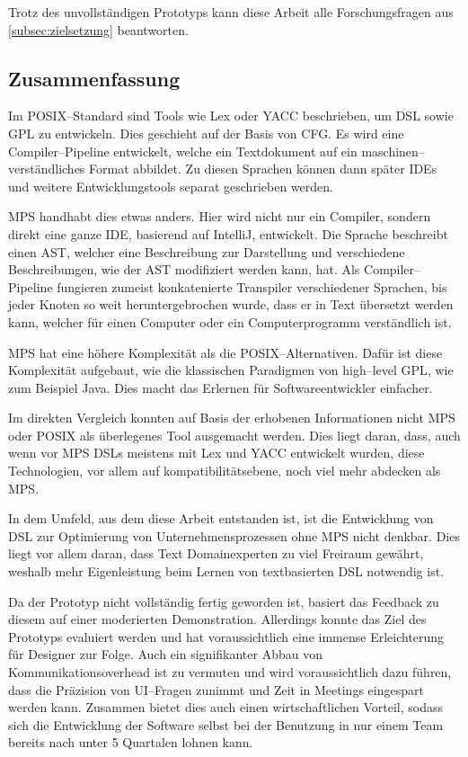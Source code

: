 Trotz des unvollständigen Prototyps kann diese Arbeit alle Forschungsfragen aus \autoref{subsec:zielsetzung} beantworten.

\subsection{Zusammenfassung}\label{subsec:zusammenfassung}
Im \acs{POSIX}--Standard sind Tools wie Lex oder \ac{YACC} beschrieben, um \ac{DSL} sowie \ac{GPL} zu entwickeln.
Dies geschieht auf der Basis von \ac{CFG}.
Es wird eine Compiler--Pipeline entwickelt, welche ein Textdokument auf ein maschinen--verständliches Format abbildet.
Zu diesen Sprachen können dann später \acp{IDE} und weitere Entwicklungstools separat geschrieben werden.

\ac{MPS} handhabt dies etwas anders.
Hier wird nicht nur ein Compiler, sondern direkt eine ganze \ac{IDE}, basierend auf IntelliJ, entwickelt.
Die Sprache beschreibt einen \ac{AST}, welcher eine Beschreibung zur Darstellung und verschiedene Beschreibungen, wie der \ac{AST} modifiziert werden kann, hat.
Als Compiler--Pipeline fungieren zumeist konkatenierte Transpiler verschiedener Sprachen, bis jeder Knoten so weit heruntergebrochen wurde, dass er in Text übersetzt werden kann, welcher für einen Computer oder ein Computerprogramm verständlich ist.

\ac{MPS} hat eine höhere Komplexität als die \acs{POSIX}--Alternativen.
Dafür ist diese Komplexität aufgebaut, wie die klassischen Paradigmen von high--level \ac{GPL}, wie zum Beispiel Java.
Dies macht das Erlernen für Softwareentwickler einfacher.

Im direkten Vergleich konnten auf Basis der erhobenen Informationen nicht \ac{MPS} oder \ac{POSIX} als überlegenes Tool ausgemacht werden.
Dies liegt daran, dass, auch wenn vor \ac{MPS} \acp{DSL} meistens mit Lex und \ac{YACC} entwickelt wurden, diese Technologien, vor allem auf kompatibilitätsebene, noch viel mehr abdecken als \ac{MPS}.

In dem Umfeld, aus dem diese Arbeit entstanden ist, ist die Entwicklung von \ac{DSL} zur Optimierung von Unternehmensprozessen ohne \ac{MPS} nicht denkbar.
Dies liegt vor allem daran, dass Text Domainexperten zu viel Freiraum gewährt, weshalb mehr Eigenleistung beim Lernen von textbasierten \ac{DSL} notwendig ist.

Da der Prototyp nicht vollständig fertig geworden ist, basiert das Feedback zu diesem auf einer moderierten Demonstration.
Allerdings konnte das Ziel des Prototyps evaluiert werden und hat voraussichtlich eine immense Erleichterung für Designer zur Folge.
Auch ein signifikanter Abbau von Kommunikationsoverhead ist zu vermuten und wird voraussichtlich dazu führen, dass die Präzision von \acs{UI}--Fragen zunimmt und Zeit in Meetings eingespart werden kann.
Zusammen bietet dies auch einen wirtschaftlichen Vorteil, sodass sich die Entwicklung der Software selbst bei der Benutzung in nur einem Team bereits nach unter 5 Quartalen lohnen kann.

